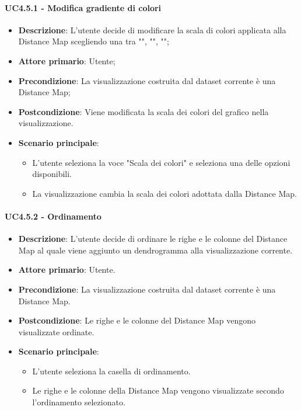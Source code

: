 \paragraph{UC4.5.1 - Modifica gradiente di colori}
\label{par:uc4.5.1}
\begin{itemize}
    \item \textbf{Descrizione}: L'utente decide di modificare la scala di colori applicata alla Distance Map scegliendo una tra "", "", "";
    \item \textbf{Attore primario}: Utente;
    \item \textbf{Precondizione}: La visualizzazione costruita dal dataset corrente è una Distance Map;
    \item \textbf{Postcondizione}: Viene modificata la scala dei colori del grafico nella visualizzazione.
    \item \textbf{Scenario principale}:
    \begin{itemize}
        \item L'utente seleziona la voce "Scala dei colori" e seleziona una delle opzioni disponibili.
        \item La visualizzazione cambia la scala dei colori adottata dalla Distance Map.
    \end{itemize}
\end{itemize}

\paragraph{UC4.5.2 - Ordinamento}
\label{par:uc4.5.2}
\begin{itemize}
    \item \textbf{Descrizione}: L'utente decide di ordinare le righe e le colonne del Distance Map al quale viene aggiunto un dendrogramma alla visualizzazione corrente.
    \item \textbf{Attore primario}: Utente.
    \item \textbf{Precondizione}: La visualizzazione costruita dal dataset corrente è una Distance Map.
    \item \textbf{Postcondizione}: Le righe e le colonne del Distance Map vengono visualizzate ordinate.
    \item \textbf{Scenario principale}:
    \begin{itemize}
        \item L'utente seleziona la casella di ordinamento.
        \item Le righe e le colonne della Distance Map vengono visualizzate secondo l'ordinamento selezionato.
    \end{itemize}
\end{itemize}

